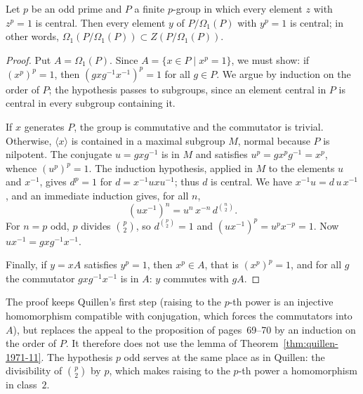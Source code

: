 \begin{encadre}
\begin{theoreme}\label{thm:quillen-1971-11-a}
Let $p$ be an odd prime and $P$ a finite $p$-group in which every element $z$ with $z^p = 1$ is central. Then every element $y$ of $P/\Omega_1(P)$ with $y^p = 1$ is central; in other words, $\Omega_1(P/\Omega_1(P)) \subset Z(P/\Omega_1(P))$.
\end{theoreme}
\end{encadre}

\begin{proof}
Put $A = \Omega_1(P)$. Since $A = \{x \in P \mid x^p = 1\}$, we must show: if $(x^p)^p = 1$, then $(gxg^{-1}x^{-1})^p = 1$ for all $g \in P$. We argue by induction on the order of $P$; the hypothesis passes to subgroups, since an element central in $P$ is central in every subgroup containing it.

If $x$ generates $P$, the group is commutative and the commutator is trivial. Otherwise, $\langle x \rangle$ is contained in a maximal subgroup $M$, normal because $P$ is nilpotent. The conjugate $u = gxg^{-1}$ is in $M$ and satisfies $u^p = g x^p g^{-1} = x^p$, whence $(u^p)^p = 1$. The induction hypothesis, applied in $M$ to the elements $u$ and $x^{-1}$, gives $d^p = 1$ for $d = x^{-1} u x u^{-1}$; thus $d$ is central. We have $x^{-1} u = d\, u\, x^{-1}$, and an immediate induction gives, for all $n$,
\[
(u x^{-1})^n = u^n\, x^{-n}\, d^{\binom n2}.
\]
For $n = p$ odd, $p$ divides $\binom p2$, so $d^{\binom p2} = 1$ and $(ux^{-1})^p = u^p x^{-p} = 1$. Now $u x^{-1} = gxg^{-1}x^{-1}$.

Finally, if $y = xA$ satisfies $y^p = 1$, then $x^p \in A$, that is $(x^p)^p = 1$, and for all $g$ the commutator $gxg^{-1}x^{-1}$ is in $A$: $y$ commutes with $gA$.
\end{proof}

\noindent The proof keeps Quillen's first step (raising to the $p$-th power is an injective homomorphism compatible with conjugation, which forces the commutators into $A$), but replaces the appeal to the proposition of pages~69--70 by an induction on the order of $P$. It therefore does not use the lemma of Theorem~\ref{thm:quillen-1971-11}. The hypothesis $p$ odd serves at the same place as in Quillen: the divisibility of $\binom p2$ by $p$, which makes raising to the $p$-th power a homomorphism in class~$2$.

